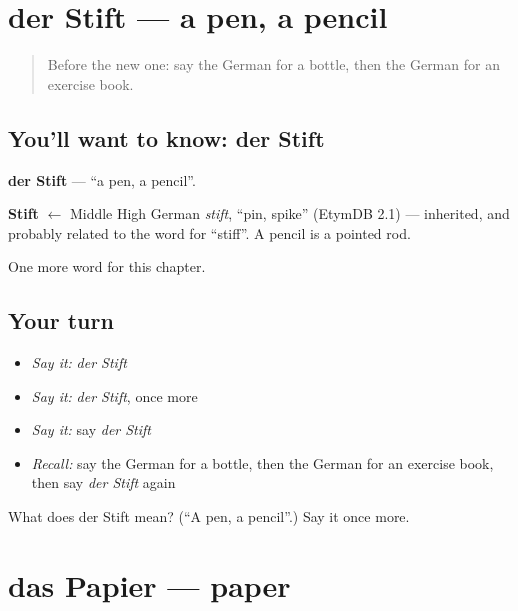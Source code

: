 \section[der Stift]{der Stift — a pen, a pencil}

\label{lesson:GE-C80-stift}



\begin{quote}
Before the new one: say the German for a bottle, then the German for an exercise book.
\end{quote}

\subsection*{You'll want to know: der Stift}
\textbf{der Stift} — \textquotedblleft{}a pen, a pencil\textquotedblright{}.

\begin{cousinweb}
\textbf{Stift} $\leftarrow$ Middle High German \emph{stift}, \textquotedblleft{}pin, spike\textquotedblright{} (EtymDB 2.1) — inherited, and probably related to the word for \textquotedblleft{}stiff\textquotedblright{}. A pencil is a pointed rod.
\end{cousinweb}

\begin{grammarlens}[title={What you've built}]
One more word for this chapter.
\end{grammarlens}

\subsection*{Your turn}
\begin{itemize}
\raggedright
  \item \emph{Say it:} \emph{der Stift}
  \item \emph{Say it:} \emph{der Stift}, once more
  \item \emph{Say it:} say \emph{der Stift}
  \item \emph{Recall:} say the German for a bottle, then the German for an exercise book, then say \emph{der Stift} again
\end{itemize}

\begin{tcolorbox}[breakable,colback=teal!4,colframe=teal!35!black,title={Before you move on}]
What does der Stift mean? (\textquotedblleft{}A pen, a pencil\textquotedblright{}.) Say it once more.
\end{tcolorbox}
\section[das Papier]{das Papier — paper}


